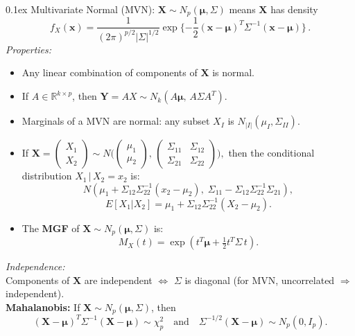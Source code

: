 \documentclass[10pt]{article}
\makeatletter
\renewcommand{\section}{\@startsection{section}{1}{0mm}
  {-0.1ex}%
  {0.1ex}%
  {\normalfont\normalsize\bfseries\color{thm-color}}}
\newcommand{\vect}[1]{\symbf{#1}} %
\makeatother
\begin{document}
\begin{multicols}{3}
  \section{Multivariate Normal (MVN):}
  \( \vect{X}\sim N_p(\vect{\mu},\Sigma) \) means \( \vect{X} \) has density
  \[f_X(\mathbf{\vect{x}}) = \frac{1}{(2\pi)^{p/2}|\Sigma|^{1/2}}\exp\{-\frac{1}{2}(\vect{x}-\vect{\mu})^T\Sigma^{-1}(\vect{x}-\vect{\mu})\}\,.\]
  \textit{Properties:}
  \begin{itemize}[left=0pt,labelsep=1pt]
    \item Any linear combination of components of \( \vect{X} \) is normal.
    \item If \( A \in \mathbb{R}^{k\times p} \), then \( \vect{Y}=AX \sim N_k(A\vect{\mu},\,A\Sigma A^T). \)
    \item Marginals of a MVN are normal: any subset \( X_I \) is \( N_{|I|}(\mu_I,\Sigma_{II}). \)
    \item If \( \vect{X}=\begin{pmatrix}X_1\\ X_2\end{pmatrix}\sim N\Big(\begin{pmatrix}\mu_1\\ \mu_2\end{pmatrix},\,\begin{pmatrix}\Sigma_{11}&\Sigma_{12}\\\Sigma_{21}&\Sigma_{22}\end{pmatrix}\Big),\) then the conditional distribution \( X_1\,|\,X_2=x_2 \) is:
          \[ N\left(\mu_1 + \Sigma_{12}\Sigma_{22}^{-1}(x_2-\mu_2),\; \Sigma_{11}-\Sigma_{12}\Sigma_{22}^{-1}\Sigma_{21} \right), \]
          \[ E[X_1|X_2]=\mu_1 + \Sigma_{12}\Sigma_{22}^{-1}(X_2-\mu_2). \]
    \item The \textbf{MGF} of \( \vect{X}\sim N_p(\vect{\mu},\Sigma) \) is:
          \[ M_X(t)=\exp(t^T \vect{\mu} + \tfrac{1}{2}t^T \Sigma\,t). \]
  \end{itemize}
  \textit{Independence:}\\[0em]
  Components of \( \vect{X} \) are independent \( \iff \) \( \Sigma \) is diagonal (for MVN, uncorrelated \( \Rightarrow \) independent).\\[0em]
  \textbf{Mahalanobis:} If \( \vect{X}\sim N_p(\vect{\mu},\Sigma) \), then
  \[ (\vect{X}-\vect{\mu})^T\Sigma^{-1}(\vect{X}-\vect{\mu}) \sim \chi^2_p \quad \text{and} \quad \Sigma^{-1/2}(\vect{X}-\vect{\mu})\sim N_p(0,I_p). \]

\end{multicols}
\end{document}
